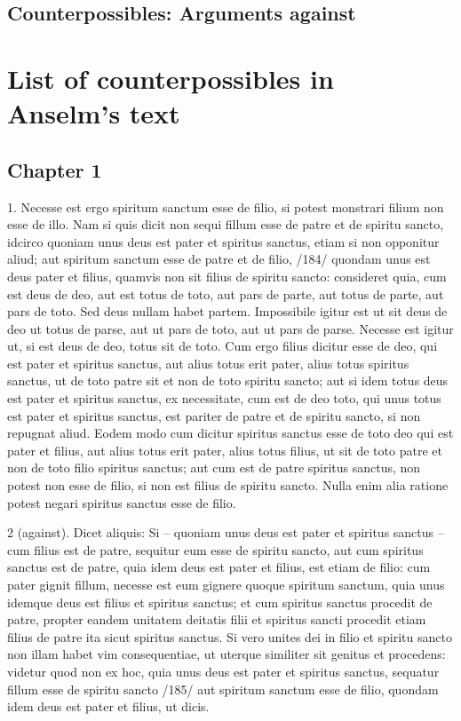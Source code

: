 \subsection{Counterpossibles: Arguments against}
\printbibliography
\section{List of counterpossibles in Anselm's text}
\subsection{Chapter 1}
1. Necesse est ergo spiritum sanctum esse de filio, si potest monstrari filium non esse de illo. Nam si quis dicit non sequi fillum esse de patre et de spiritu sancto, idcirco quoniam unus deus est pater et spiritus sanctus, etiam si non opponitur aliud; aut spiritum sanctum esse de patre et de filio, /184/ quondam unus est deus pater et filius, quamvis non sit filius de spiritu sancto: consideret quia, cum est deus de deo, aut est totus de toto, aut pars de parte, aut totus de parte, aut pars de toto. Sed deus nullam habet partem. Impossibile igitur est ut sit deus de deo ut totus de parse, aut ut pars de toto, aut ut pars de parse. Necesse est igitur ut, si est deus de deo, totus sit de toto. Cum ergo filius dicitur esse de deo, qui est pater et spiritus sanctus, aut alius totus erit pater, alius totus spiritus sanctus, ut de toto patre sit et non de toto spiritu sancto; aut si idem totus deus est pater et spiritus sanctus, ex necessitate, cum est de deo toto, qui unus totus est pater et spiritus sanctus, est pariter de patre et de spiritu sancto, si non repugnat aliud. Eodem modo cum dicitur spiritus sanctus esse de toto deo qui est pater et filius, aut alius totus erit pater, alius totus filius, ut sit de toto patre et non de toto filio spiritus sanctus; aut cum est de patre spiritus sanctus, non potest non esse de filio, si non est filius de spiritu sancto. Nulla enim alia ratione potest negari spiritus sanctus esse de filio.

2 (against). Dicet aliquis: Si -- quoniam unus deus est pater et spiritus sanctus -- cum filius est de patre, sequitur eum esse de spiritu sancto, aut cum spiritus sanctus est de patre, quia idem deus est pater et filius, est etiam de filio: cum pater gignit fillum, necesse est eum gignere quoque spiritum sanctum, quia unus idemque deus est filius et spiritus sanctus; et cum spiritus sanctus procedit de patre, propter eandem unitatem deitatis filii et spiritus sancti procedit etiam filius de patre ita sicut spiritus sanctus. Si vero unites dei in filio et spiritu sancto non illam habet vim consequentiae, ut uterque similiter sit genitus et procedens: videtur quod non ex hoc, quia unus deus est pater et spiritus sanctus, sequatur fillum esse de spiritu sancto /185/ aut spiritum sanctum esse de filio, quondam idem deus est pater et filius, ut dicis.

